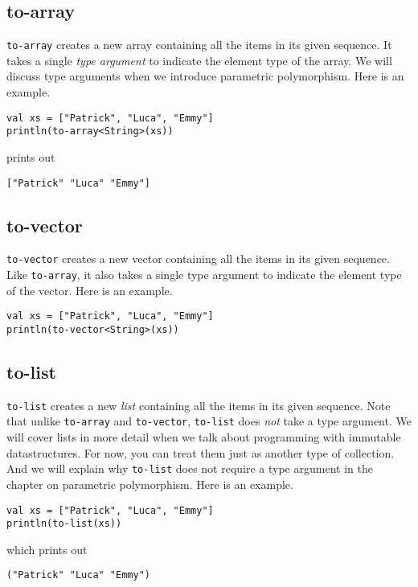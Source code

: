 \documentclass[10pt,oneside]{book}
\begin{document}
\subsection*{to-array}
\texttt{\frenchspacing to-array} creates a new array containing all the items in its given sequence. It takes a single {\em type argument} to indicate the element type of the array. We will discuss type arguments when we introduce parametric polymorphism. 
Here is an example.
\begin{lstlisting}
val xs = ["Patrick", "Luca", "Emmy"]
println(to-array<String>(xs))
\end{lstlisting}
prints out
\begin{lstlisting}
["Patrick" "Luca" "Emmy"]
\end{lstlisting}

\subsection*{to-vector}
\texttt{\frenchspacing to-vector} creates a new vector containing all the items in its given sequence. Like \texttt{\frenchspacing to-array}, it also takes a single type argument to indicate the element type of the vector. 
Here is an example.
\begin{lstlisting}
val xs = ["Patrick", "Luca", "Emmy"]
println(to-vector<String>(xs))
\end{lstlisting}

\subsection*{to-list}
\texttt{\frenchspacing to-list} creates a new {\em list} containing all the items in its given sequence. Note that unlike \texttt{\frenchspacing to-array} and \texttt{\frenchspacing to-vector}, \texttt{\frenchspacing to-list} does {\em not} take a type argument. We will cover lists in more detail when we talk about programming with immutable datastructures. For now, you can treat them just as another type of collection. And we will explain why \texttt{\frenchspacing to-list} does not require a type argument in the chapter on parametric polymorphism.
Here is an example.
\begin{lstlisting}
val xs = ["Patrick", "Luca", "Emmy"]
println(to-list(xs))
\end{lstlisting}
which prints out
\begin{lstlisting}
("Patrick" "Luca" "Emmy")
\end{lstlisting}
\end{document}
